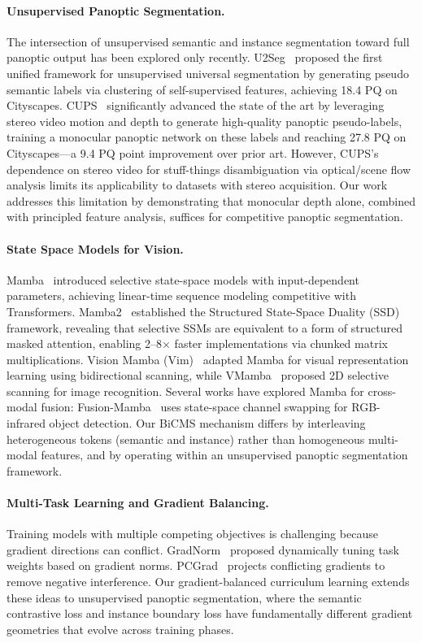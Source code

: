 \documentclass{article}
\begin{document}
\paragraph{Unsupervised Panoptic Segmentation.}
The intersection of unsupervised semantic and instance segmentation toward full panoptic output has been explored only recently. U2Seg~\cite{niu2024u2seg} proposed the first unified framework for unsupervised universal segmentation by generating pseudo semantic labels via clustering of self-supervised features, achieving 18.4 PQ on Cityscapes. CUPS~\cite{hahn2025cups} significantly advanced the state of the art by leveraging stereo video motion and depth to generate high-quality panoptic pseudo-labels, training a monocular panoptic network on these labels and reaching 27.8 PQ on Cityscapes---a 9.4 PQ point improvement over prior art. However, CUPS's dependence on stereo video for stuff-things disambiguation via optical/scene flow analysis limits its applicability to datasets with stereo acquisition. Our work addresses this limitation by demonstrating that monocular depth alone, combined with principled feature analysis, suffices for competitive panoptic segmentation.

\paragraph{State Space Models for Vision.}
Mamba~\cite{gu2023mamba} introduced selective state-space models with input-dependent parameters, achieving linear-time sequence modeling competitive with Transformers. Mamba2~\cite{dao2024mamba2} established the Structured State-Space Duality (SSD) framework, revealing that selective SSMs are equivalent to a form of structured masked attention, enabling 2--8$\times$ faster implementations via chunked matrix multiplications. Vision Mamba (Vim)~\cite{zhu2024vim} adapted Mamba for visual representation learning using bidirectional scanning, while VMamba~\cite{liu2024vmamba} proposed 2D selective scanning for image recognition. Several works have explored Mamba for cross-modal fusion: Fusion-Mamba~\cite{dong2024fusionmamba} uses state-space channel swapping for RGB-infrared object detection. Our BiCMS mechanism differs by interleaving heterogeneous tokens (semantic and instance) rather than homogeneous multi-modal features, and by operating within an unsupervised panoptic segmentation framework.

\paragraph{Multi-Task Learning and Gradient Balancing.}
Training models with multiple competing objectives is challenging because gradient directions can conflict. GradNorm~\cite{chen2018gradnorm} proposed dynamically tuning task weights based on gradient norms. PCGrad~\cite{yu2020pcgrad} projects conflicting gradients to remove negative interference. Our gradient-balanced curriculum learning extends these ideas to unsupervised panoptic segmentation, where the semantic contrastive loss and instance boundary loss have fundamentally different gradient geometries that evolve across training phases.
\end{document}
